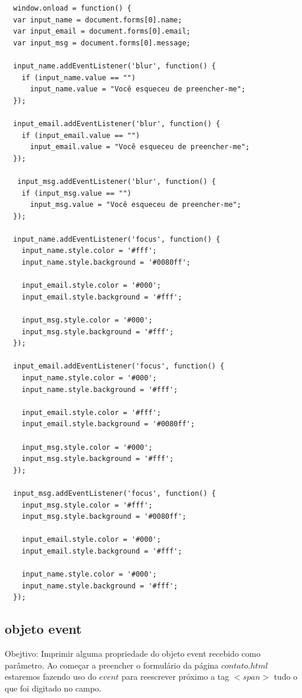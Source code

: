  \begin{lstlisting}
  window.onload = function() {
  var input_name = document.forms[0].name;
  var input_email = document.forms[0].email;
  var input_msg = document.forms[0].message;

  input_name.addEventListener('blur', function() {
    if (input_name.value == "")
      input_name.value = "Você esqueceu de preencher-me";
  });

  input_email.addEventListener('blur', function() {
    if (input_email.value == "")
      input_email.value = "Você esqueceu de preencher-me";
  });

   input_msg.addEventListener('blur', function() {
    if (input_msg.value == "")
      input_msg.value = "Você esqueceu de preencher-me";
  });

  input_name.addEventListener('focus', function() {
    input_name.style.color = '#fff';
    input_name.style.background = '#0080ff';

    input_email.style.color = '#000';
    input_email.style.background = '#fff';

    input_msg.style.color = '#000';
    input_msg.style.background = '#fff';
  });

  input_email.addEventListener('focus', function() {
    input_name.style.color = '#000';
    input_name.style.background = '#fff';

    input_email.style.color = '#fff';
    input_email.style.background = '#0080ff';

    input_msg.style.color = '#000';
    input_msg.style.background = '#fff';
  });

  input_msg.addEventListener('focus', function() {
    input_msg.style.color = '#fff';
    input_msg.style.background = '#0080ff';

    input_email.style.color = '#000';
    input_email.style.background = '#fff';

    input_name.style.color = '#000';
    input_name.style.background = '#fff';
  });
 \end{lstlisting}
\subsection{objeto event}
Obejtivo: Imprimir alguma propriedade do objeto event recebido como parâmetro. Ao começar a preencher o formulário da página $contato.html$ estaremos fazendo uso do $event$ para reescrever próximo a tag $<span>$ tudo o que foi digitado no campo.

